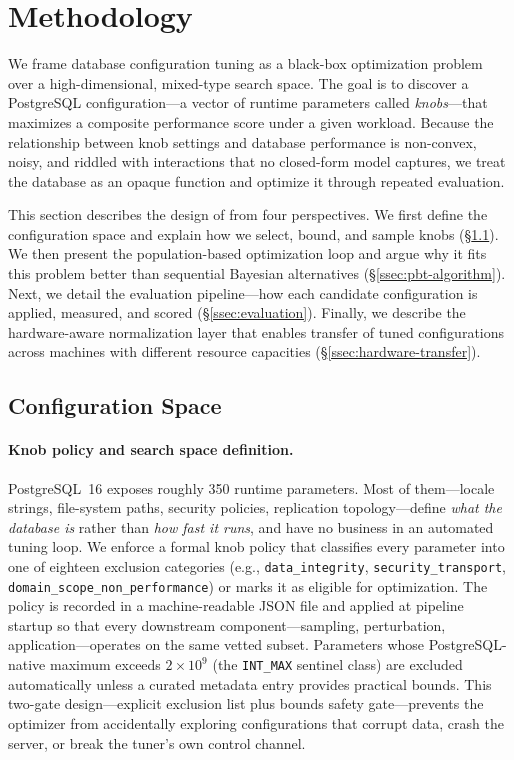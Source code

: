 \section{Methodology}
\label{sec:methodology}

We frame database configuration tuning as a black-box optimization problem
over a high-dimensional, mixed-type search space.  The goal is to discover a
PostgreSQL configuration---a vector of runtime parameters called
\emph{knobs}---that maximizes a composite performance score under a given
workload.  Because the relationship between knob settings and database
performance is non-convex, noisy, and riddled with interactions that no
closed-form model captures, we treat the database as an opaque function and
optimize it through repeated evaluation.

This section describes the design of \sysname from four perspectives.  We
first define the configuration space and explain how we select, bound, and
sample knobs (\S\ref{ssec:config-space}).  We then present the
population-based optimization loop and argue why it fits this problem better
than sequential Bayesian alternatives (\S\ref{ssec:pbt-algorithm}).  Next, we
detail the evaluation pipeline---how each candidate configuration is applied,
measured, and scored (\S\ref{ssec:evaluation}).  Finally, we describe the
hardware-aware normalization layer that enables transfer of tuned
configurations across machines with different resource capacities
(\S\ref{ssec:hardware-transfer}).

\subsection{Configuration Space}
\label{ssec:config-space}

\paragraph{Knob policy and search space definition.}
PostgreSQL~16 exposes roughly 350 runtime parameters.  Most of them---locale
strings, file-system paths, security policies, replication topology---define
\emph{what the database is} rather than \emph{how fast it runs}, and have no
business in an automated tuning loop.  We enforce a formal knob policy that
classifies every parameter into one of eighteen exclusion categories (e.g.,
\texttt{data\_integrity}, \texttt{security\_transport},
\texttt{domain\_scope\_non\_performance}) or marks it as eligible for
optimization.  The policy is recorded in a machine-readable JSON file and
applied at pipeline startup so that every downstream component---sampling,
perturbation, application---operates on the same vetted subset.  Parameters
whose PostgreSQL-native maximum exceeds $2 \times 10^{9}$ (the
\texttt{INT\_MAX} sentinel class) are excluded automatically unless a curated
metadata entry provides practical bounds.  This two-gate design---explicit
exclusion list plus bounds safety gate---prevents the optimizer from
accidentally exploring configurations that corrupt data, crash the server, or
break the tuner's own control channel.


